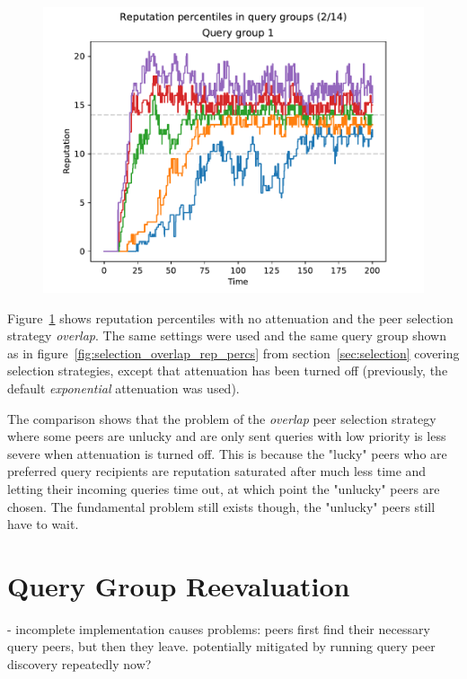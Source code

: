 \begin{figure}[t]
\centering
\includegraphics[width=1\columnwidth]{figures/attenuation_no_attenuation_selection_overlap_rep_percs_2_of_14}
\label{fig:attenuation_no_att_selection_overlap_rep_percs}
\end{figure}

Figure~\ref{fig:attenuation_no_att_selection_overlap_rep_percs} shows reputation
percentiles with no attenuation and the peer selection strategy \emph{overlap}.
The same settings were used and the same query group shown as in
figure~\ref{fig:selection_overlap_rep_percs} from section~\ref{sec:selection}
covering selection strategies, except that attenuation has been turned off
(previously, the default \emph{exponential} attenuation was used).

The comparison shows that the problem of the \emph{overlap} peer selection
strategy where some peers are unlucky and are only sent queries with low
priority is less severe when attenuation is turned off. This is because the
"lucky" peers who are preferred query recipients are reputation saturated after
much less time and letting their incoming queries time out, at which point the
"unlucky" peers are chosen. The fundamental problem still exists though, the
"unlucky" peers still have to wait.

\section{Query Group Reevaluation}
\label{sec:rep_avail_group_reeval}
- incomplete implementation causes problems: peers first find their necessary
  query peers, but then they leave. potentially mitigated by running query peer
  discovery repeatedly now?

